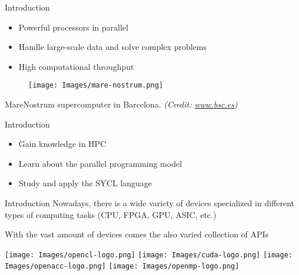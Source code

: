 \begin{frame}{Introduction}
\begin{center}
\begin{itemize}
  \item Powerful processors in parallel
  \item Handle large-scale data and solve complex problems
  \item High computational throughput
\end{itemize}
\endblock{}
\begin{figure}[H]
	\texttt{[image: Images/mare-nostrum.png]}
\end{figure}
MareNostrum supercomputer in Barcelona. \textit{(Credit: \url{www.bsc.es})}
\end{center}
\end{frame}
\begin{frame}{Introduction}
\begin{center}
\begin{itemize}
  \item Gain knowledge in HPC
  \item Learn about the parallel programming model
  \item Study and apply the SYCL language
\end{itemize}
\endblock{}
\end{center}
\end{frame}
\begin{frame}{Introduction}
  Nowadays, there is a wide variety of devices specialized in different types of computing tasks (CPU, FPGA, GPU, ASIC, etc.)
\begin{block}{}
With the vast amount of devices comes the also varied collection of
APIs
\end{block}
\begin{center}
	\texttt{[image: Images/opencl-logo.png]}
	\texttt{[image: Images/cuda-logo.png]}
	\texttt{[image: Images/openacc-logo.png]}
	\texttt{[image: Images/openmp-logo.png]}
\end{center}
\end{frame}  
